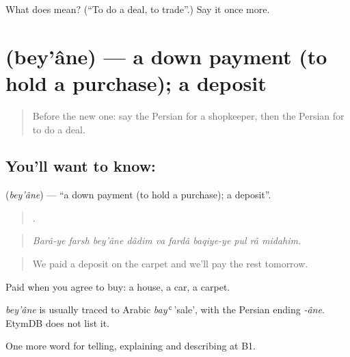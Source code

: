 \begin{tcolorbox}[breakable,colback=teal!4,colframe=teal!35!black,title={Before you move on}]
What does   mean? (\textquotedblleft{}To do a deal, to trade\textquotedblright{}.) Say it once more.
\end{tcolorbox}
\section[\texorpdfstring{\fa{بیعانه} (bey'âne)}{بیعانه (bey'âne)}]{ (bey'âne) — a down payment (to hold a purchase); a deposit}

\label{lesson:FA-C464-beyane}



\begin{quote}
Before the new one: say the Persian for a shopkeeper, then the Persian for to do a deal.
\end{quote}

\subsection*{You'll want to know: }
\textbf{} (\emph{bey'âne}) — \textquotedblleft{}a down payment (to hold a purchase); a deposit\textquotedblright{}.

\begin{quote}
         .
\end{quote}

\begin{quote}
\emph{Barâ-ye farsh bey'âne dâdim va fardâ baqiye-ye pul râ midahim.}
\end{quote}

\begin{quote}
We paid a deposit on the carpet and we'll pay the rest tomorrow.
\end{quote}

Paid when you agree to buy: a house, a car, a carpet.

\begin{cousinweb}
\emph{bey'âne} is usually traced to Arabic \emph{bayʿ} 'sale', with the Persian ending \emph{-âne}. EtymDB does not list it.
\end{cousinweb}

\begin{grammarlens}[title={What you've built}]
One more word for telling, explaining and describing at B1.
\end{grammarlens}

